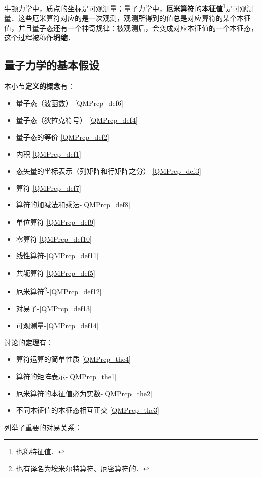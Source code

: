 牛顿力学中，质点的坐标是可观测量；量子力学中，\textbf{厄米算符}的\textbf{本征值}\footnote{也称特征值．}是可观测量．这些厄米算符对应的是一次观测，观测所得到的值总是对应算符的某个本征值，并且量子态还有一个神奇规律：被观测后，会变成对应本征值的一个本征态，这个过程被称作\textbf{坍缩}．



\subsection{量子力学的基本假设}

本小节\textbf{定义的概念}有：

\begin{itemize}
\item 量子态（波函数）-\autoref{QMPrcp_def6} 
\item 量子态（狄拉克符号）-\autoref{QMPrcp_def4} 
\item 量子态的等价-\autoref{QMPrcp_def2} 
\item 内积-\autoref{QMPrcp_def1} 
\item 态矢量的坐标表示（列矩阵和行矩阵之分）-\autoref{QMPrcp_def3} 
\item 算符-\autoref{QMPrcp_def7} 
\item 算符的加减法和乘法-\autoref{QMPrcp_def8} 
\item 单位算符-\autoref{QMPrcp_def9} 
\item 零算符-\autoref{QMPrcp_def10} 
\item 线性算符-\autoref{QMPrcp_def11} 
\item 共轭算符-\autoref{QMPrcp_def5} 
\item 厄米算符\footnote{也有译名为埃米尔特算符、厄密算符的．}-\autoref{QMPrcp_def12} 
\item 对易子-\autoref{QMPrcp_def13} 
\item 可观测量-\autoref{QMPrcp_def14} 
\end{itemize}


讨论的\textbf{定理}有：

\begin{itemize}
\item 算符运算的简单性质-\autoref{QMPrcp_the4} 
\item 算符的矩阵表示-\autoref{QMPrcp_the1} 
\item 厄米算符的本征值必为实数-\autoref{QMPrcp_the2} 
\item 不同本征值的本征态相互正交-\autoref{QMPrcp_the3} 
\end{itemize}

列举了重要的对易关系：

